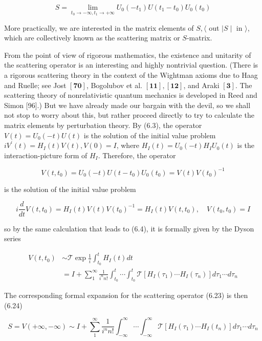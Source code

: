 \documentclass[10pt, letterpaper]{article}
\begin{document}
$$
S=\lim _{t_{0} \rightarrow-\infty, t_{1} \rightarrow+\infty} U_{0}\left(-t_{1}\right) U\left(t_{1}-t_{0}\right) U_{0}\left(t_{0}\right)
$$

More practically, we are interested in the matrix elements of $S,\langle$ out $| S \mid$ in $\rangle$, which are collectively known as the scattering matrix or $S$-matrix.

From the point of view of rigorous mathematics, the existence and unitarity of the scattering operator is an interesting and highly nontrivial question. (There is a rigorous scattering theory in the context of the Wightman axioms due to Haag and Ruelle; see Jost $[\mathbf{7 0}]$, Bogolubov et al. $[\mathbf{1 1}],[\mathbf{1 2}]$, and Araki $[\mathbf{3}]$. The scattering theory of nonrelativistic quantum mechanics is developed in Reed and Simon [96].) But we have already made our bargain with the devil, so we shall not stop to worry about this, but rather proceed directly to try to calculate the matrix elements by perturbation theory. By (6.3), the operator $V(t)=U_{0}(-t) U(t)$ is the solution of the initial value problem $i V^{\prime}(t)=H_{I}(t) V(t), V(0)=I$, where $H_{I}(t)=U_{0}(-t) H_{I} U_{0}(t)$ is the interaction-picture form of $H_{I}$. Therefore, the operator

$$
V\left(t, t_{0}\right)=U_{0}(-t) U\left(t-t_{0}\right) U_{0}\left(t_{0}\right)=V(t) V\left(t_{0}\right)^{-1}
$$

is the solution of the initial value problem

$$
i \frac{d}{d t} V\left(t, t_{0}\right)=H_{I}(t) V(t) V\left(t_{0}\right)^{-1}=H_{I}(t) V\left(t, t_{0}\right), \quad V\left(t_{0}, t_{0}\right)=I
$$

so by the same calculation that leads to (6.4), it is formally given by the Dyson series

$$
\begin{aligned}
V\left(t, t_{0}\right) & \sim \mathcal{T} \exp \frac{1}{i} \int_{t_{0}}^{t} H_{I}(t) d t \\
& =I+\sum_{1}^{\infty} \frac{1}{i^{n} n!} \int_{t_{0}}^{t} \cdots \int_{t_{0}}^{t} \mathcal{T}\left[H_{I}\left(\tau_{1}\right) \cdots H_{I}\left(\tau_{n}\right)\right] d \tau_{1} \cdots d \tau_{n}
\end{aligned}
$$

The corresponding formal expansion for the scattering operator (6.23) is then (6.24)

$$
S=V(+\infty,-\infty) \sim I+\sum_{1}^{\infty} \frac{1}{i^{n} n!} \int_{-\infty}^{\infty} \cdots \int_{-\infty}^{\infty} \mathcal{T}\left[H_{I}\left(\tau_{1}\right) \cdots H_{I}\left(t_{n}\right)\right] d \tau_{1} \cdots d \tau_{n}
$$
\end{document}
